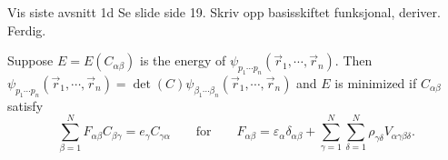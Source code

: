 \documentclass[11pt,english,a4paper]{article}
\begin{document}
Vis siste avsnitt 1d Se slide side 19. Skriv opp basisskiftet funksjonal, deriver. Ferdig.
\begin{theorem}
Suppose $E = E(C_{  \alpha \beta})$ is the energy of $\psi_{  p_1\cdots p_n}(\vec{r}_1,\cdots, \vec{r}_n)$. Then $\psi_{  p_1\cdots p_n}(\vec{r}_1,\cdots, \vec{r}_n) = \det (C) \psi_{  \beta_1\cdots \beta_n}(\vec{r}_1,\cdots, \vec{r}_n)$ and $E$ is minimized if $C_{  \alpha \beta}$ satisfy
\begin{equation}
\sum_{  \beta = 1}^N F_{  \alpha \beta} C_{  \beta \gamma} = e_\gamma C_{  \gamma \alpha} \qquad \text{for} \qquad F_{  \alpha \beta} = \varepsilon_{  \alpha} \delta_{  \alpha \beta} + \sum_{  \gamma = 1}^N \sum_{  \delta = 1}^N  \rho_{ \gamma \delta}V_{  \alpha \gamma \beta \delta}. \label{eq:hfeq}
\end{equation}
\end{theorem}
\end{document}
